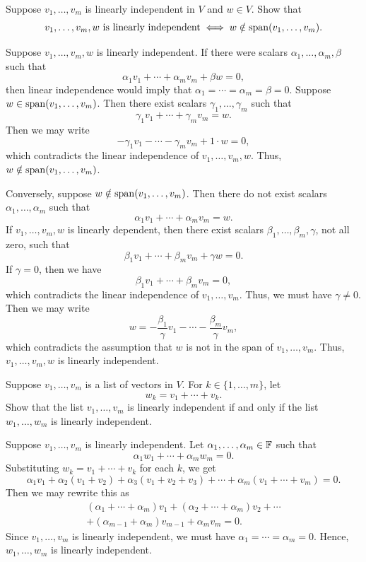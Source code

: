 \begin{exc}
\begin{exercise}
Suppose $v_1,\dots,v_m$ is linearly independent in $V$ and $w\in V$. Show that
\[ v_1,\dots,v_m,w \text{ is linearly independent} \iff
   w\notin\operatorname{span}(v_1,\dots,v_m). \]
\end{exercise}
\begin{solution}
Suppose $v_1,\dots,v_m,w$ is linearly independent. If there were scalars
$\alpha_1,\dots,\alpha_m,\beta$ such that
\[ \alpha_1v_1+\cdots+\alpha_mv_m+\beta w=0, \]
then linear independence would imply that $\alpha_1=\cdots=\alpha_m=\beta=0$.
Suppose $w\in\operatorname{span}(v_1,\dots,v_m)$. Then there exist scalars
$\gamma_1,\dots,\gamma_m$ such that
\[ \gamma_1v_1+\cdots+\gamma_mv_m=w. \]
Then we may write
\[ -\gamma_1v_1-\cdots-\gamma_mv_m+1\cdot w=0, \]
which contradicts the linear independence of $v_1,\dots,v_m,w$. Thus,
$w\notin\operatorname{span}(v_1,\allowbreak\dots,\allowbreak v_m)$.

Conversely, suppose $w\notin\operatorname{span}(v_1,\dots,v_m)$. Then there do not exist
scalars $\alpha_1,\dots,\alpha_m$ such that
\[ \alpha_1v_1+\cdots+\alpha_mv_m=w. \]
If $v_1,\dots,v_m,w$ is linearly dependent, then there exist scalars
$\beta_1,\dots,\beta_m,\gamma$, not all zero, such that
\[ \beta_1v_1+\cdots+\beta_mv_m+\gamma w=0. \]
If $\gamma=0$, then we have
\[ \beta_1v_1+\cdots+\beta_mv_m=0, \]
which contradicts the linear independence of $v_1,\dots,v_m$. Thus, we must
have $\gamma\ne0$. Then we may write
\[ w = -\frac{\beta_1}{\gamma}v_1-\cdots-\frac{\beta_m}{\gamma}v_m, \]
which contradicts the assumption that $w$ is not in the span of
$v_1,\dots,v_m$. Thus, $v_1,\dots,v_m,w$ is linearly independent.
\end{solution}

\begin{exercise}
Suppose $v_1,\dots,v_m$ is a list of vectors in $V$. For $k\in\{1,\dots,m\}$,
let
\[ w_k = v_1+\cdots+v_k. \]
Show that the list $v_1,\dots,v_m$ is linearly independent if and only if the
list $w_1,\dots,w_m$ is linearly independent.
\end{exercise}
\begin{solution}
Suppose $v_1,\dots,v_m$ is linearly independent. Let
$\alpha_1,\dots,\alpha_m\in\mathbb{F}$ such that
\[ \alpha_1w_1+\cdots+\alpha_mw_m=0. \]
Substituting $w_k=v_1+\cdots+v_k$ for each $k$, we get
\[ \alpha_1v_1+\alpha_2(v_1+v_2)+\alpha_3(v_1+v_2+v_3)+\cdots
   +\alpha_m(v_1+\cdots+v_m)=0. \]
Then we may rewrite this as
\begin{multline*}
(\alpha_1+\cdots+\alpha_m)v_1+(\alpha_2+\cdots+\alpha_m)v_2+\cdots\\
+(\alpha_{m-1}+\alpha_m)v_{m-1}+\alpha_mv_m=0.
\end{multline*}
Since $v_1,\dots,v_m$ is linearly independent, we must have
$\alpha_1=\cdots=\alpha_m=0$. Hence, $w_1,\dots,w_m$ is linearly independent.


\end{solution}
\end{exc}

